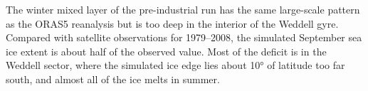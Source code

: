 The winter mixed layer of the pre-industrial run has the same large-scale pattern as the ORAS5 reanalysis but is too deep in the interior of the Weddell gyre. Compared with satellite observations for 1979–2008, the simulated September sea ice extent is about half of the observed value. Most of the deficit is in the Weddell sector, where the simulated ice edge lies about 10° of latitude too far south, and almost all of the ice melts in summer.
